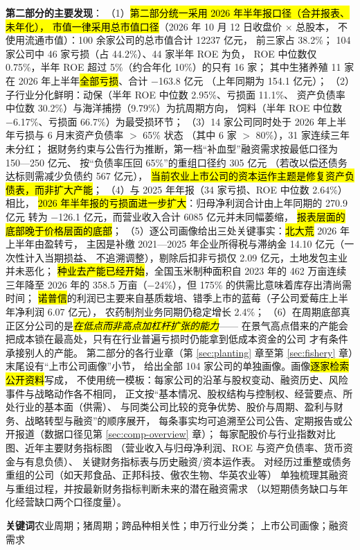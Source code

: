 \begin{keybox}[报告要点]
\textbf{第二部分的主要发现}：
（1）\hl{第二部分统一采用 2026 年半年报口径（合并报表、未年化），
市值一律采用总市值口径}（2026 年 10 月 12 日收盘价 $\times$ 总股本，
不使用流通市值）：100 余家公司的总市值合计 \num{12237} 亿元，
前三家占 \num{38.2}\%；
\num{104} 家公司中 \num{46} 家亏损（占 \num{44.2}\%）、\num{44} 家半年 ROE 为负，
ROE 中位数仅 \num{0.75}\%，半年 ROE 超过 \num{5}\%（约合年化 \num{10}\%）的只有 \num{16} 家；
其中生猪养殖 \num{11} 家在 2026 年上半年\hl{全部亏损}、合计 \num{-163.8} 亿元
（上年同期为 \num{+154.1} 亿元）；
（2）子行业分化鲜明：动保（半年 ROE 中位数 \num{2.95}\%、亏损面 \num{11.1}\%、
资产负债率中位数 \num{30.2}\%）与海洋捕捞（\num{9.79}\%）为抗周期方向，
饲料（半年 ROE 中位数 \num{-6.17}\%、亏损面 \num{66.7}\%）为最受损环节；
（3）\num{14} 家公司同时处于 2026 年上半年亏损与 6 月末资产负债率 $>$ \num{65}\% 状态
（其中 \num{6} 家 $>$ \num{80}\%），\num{31} 家连续三年未分红；
据财务约束与公告行为推断，第一档“补血型”融资需求按最低口径为 \num{150}---\num{250} 亿元、
按“负债率压回 \num{65}\%”的重组口径约 \num{305} 亿元
（若改以偿还债务达标则需减少负债约 \num{567} 亿元），
\hl{当前农业上市公司的资本运作主题是修复资产负债表，而非扩大产能}；
（4）与 2025 年年报（\num{34} 家亏损、ROE 中位数 \num{2.64}\%）相比，
\hl{2026 年半年报的亏损面进一步扩大}：归母净利润合计由上年同期的 \num{+270.9} 亿元
转为 \num{-126.1} 亿元，而营业收入合计 \num{6085} 亿元并未同幅萎缩，
\hl{报表层面的底部晚于价格层面的底部}；
（5）逐公司画像给出三处关键事实：\hl{北大荒} 2026 年上半年由盈转亏，
主因是补缴 2021---2025 年企业所得税与滞纳金 \num{14.10} 亿元（一次性计入当期损益、
不追溯调整），剔除后扣非亏损仅 \num{2.09} 亿元，土地发包主业并未恶化；
\hl{种业去产能已经开始}，全国玉米制种面积自 2023 年的 \num{462} 万亩连续三年降至
2026 年的 \num{358.5} 万亩（\num{-24}\%），但 \num{175}\% 的供需比意味着库存出清尚需时间；
\hl{诺普信}的利润已主要来自基质栽培、错季上市的蓝莓（子公司爱莓庄上半年净利润 \num{6.07} 亿元），
农药制剂业务同期仍稳定增长 \num{2.4}\%；
（6）在周期底部真正区分公司的是\hl{\emph{在低点而非高点加杠杆扩张的能力}}——
在景气高点借来的产能会把成本锁在最高处，只有在行业普遍亏损时仍能拿到低成本资金的公司
才有条件承接别人的产能。
第二部分的各行业章（第 \ref{sec:planting} 章至第 \ref{sec:fishery} 章）末尾设有“上市公司画像”小节，
给出全部 \num{104} 家公司的单独画像。画像\hl{逐家检索公开资料}写成，
不使用统一模板：每家公司的沿革与股权变动、融资历史、风险事件与战略动作各不相同，
正文按“基本情况、股权结构与控制权、经营要点、所处行业的基本面（供需）、
与同类公司比较的竞争优势、股价与周期、盈利与财务、战略转型与融资”的顺序展开，
每条事实均可追溯至公司公告、定期报告或公开报道（数据口径见第 \ref{sec:comp-overview} 章）；
每家配股价与行业指数对比图、近年主要财务指标图
（营业收入与归母净利润、ROE 与资产负债率、货币资金与有息负债）、
关键财务指标表与历史融资/资本运作表。
对经历过重整或债务重组的公司（如天邦食品、正邦科技、傲农生物、华英农业等）
单独梳理其融资与重组过程，并按最新财务指标判断未来的潜在融资需求
（以短期债务缺口与年化经营缺口两个口径度量）。
\end{keybox}

\vspace{6pt}
\noindent\textbf{关键词}\quad 农业周期；猪周期；跨品种相关性；申万行业分类；
上市公司画像；融资需求
\clearpage
